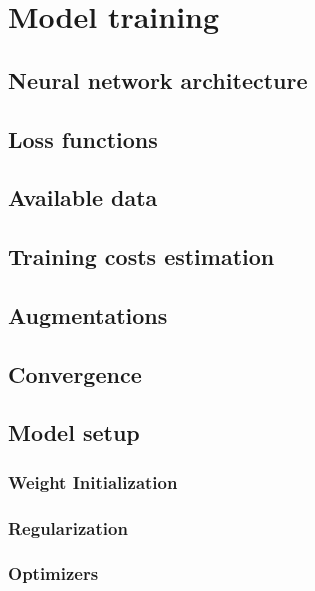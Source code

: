\section{Model training}
    \subsection{Neural network architecture}
        
    \subsection{Loss functions}
        
    \subsection{Available data}
        
    \subsection{Training costs estimation}
        
        \subsection{Augmentations}
        
        \subsection{Convergence}
        
        \subsection{Model setup}
            \subsubsection{Weight Initialization}
            
            \subsubsection{Regularization}
            
            \subsubsection{Optimizers}
            
